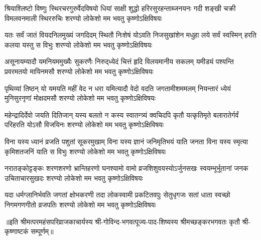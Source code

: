 
\fourlineindentedshloka
{श्रियाश्लिष्टो विष्णुः स्थिरचरगुरुर्वेदविषयो}
{धियां साक्षी शुद्धो हरिरसुरहन्ताब्जनयनः}
{गदी शङ्खी चक्री विमलवनमाली स्थिररुचिः}
{शरण्यो लोकेशो मम भवतु कृष्णोऽक्षिविषयः}

\fourlineindentedshloka
{यतः सर्वं जातं वियदनिलमुख्यं जगदिदम्}
{स्थितौ निःशेषं योऽवति निजसुखांशेन मधुहा}
{लये सर्वं स्वस्मिन् हरति कलया यस्तु स विभुः}
{शरण्यो लोकेशो मम भवतु कृष्णोऽक्षिविषयः}

\fourlineindentedshloka
{असूनायम्यादौ यमनियममुख्यैः सुकरणैः}
{निरुद्‌ध्येदं चित्तं हृदि विलयमानीय सकलम्}
{यमीड्यं पश्यन्ति प्रवरमतयो मायिनमसौ}
{शरण्यो लोकेशो मम भवतु कृष्णोऽक्षिविषयः}

\fourlineindentedshloka
{पृथिव्यां तिष्ठन् यो यमयति महीं वेद न धरा}
{यमित्यादौ वेदो वदति जगतामीशममलम्}
{नियन्तारं ध्येयं मुनिसुरनृणां मोक्षदमसौ}
{शरण्यो लोकेशो मम भवतु कृष्णोऽक्षिविषयः}

\fourlineindentedshloka
{महेन्द्रादिर्देवो जयति दितिजान् यस्य बलतो}
{न कस्य स्वातन्त्र्यं क्वचिदपि कृतौ यत्कृतिमृते}
{बलारातेर्गर्वं परिहरति योऽसौ विजयिनः}
{शरण्यो लोकेशो मम भवतु कृष्णोऽक्षिविषयः}

\fourlineindentedshloka
{विना यस्य ध्यानं व्रजति पशुतां सूकरमुखाम्}
{विना यस्य ज्ञानं जनिमृतिभयं याति जनता}
{विना यस्य स्मृत्या कृमिशतजनिं याति स विभुः}
{शरण्यो लोकेशो मम भवतु कृष्णोऽक्षिविषयः}

\fourlineindentedshloka
{नरातङ्कोट्टङ्कः शरणशरणो भ्रान्तिहरणो}
{घनश्यामो वामो व्रजशिशुवयस्योऽर्जुनसखः}
{स्वयम्भूर्भूतानां जनक उचिताचारसुखदः}
{शरण्यो लोकेशो मम भवतु कृष्णोऽक्षिविषयः}

\fourlineindentedshloka
{यदा धर्मग्लानिर्भवति जगतां क्षोभकरणी}
{तदा लोकस्वामी प्रकटितवपुः सेतुधृगजः}
{सतां धाता स्वच्छो निगमगणगीतो व्रजपतिः}
{शरण्यो लोकेशो मम भवतु कृष्णोऽक्षिविषयः}

॥इति श्रीमत्परमहंसपरिव्राजकाचार्यस्य श्री-गोविन्द-भगवत्पूज्य-पाद-शिष्यस्य 
श्रीमच्छङ्करभगवतः कृतौ श्री-कृष्णाष्टकं सम्पूर्णम्॥